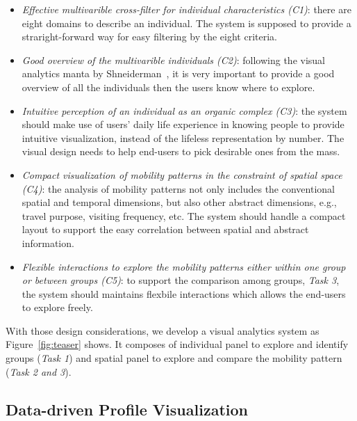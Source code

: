 \begin{itemize}
\item \textit{Effective multivarible cross-filter for individual characteristics (C1)}: there are eight domains to describe an individual. The system is supposed to provide a straright-forward way for easy filtering by the eight criteria.
\item \textit{Good overview of the multivarible individuals (C2)}: following the visual analytics manta by Shneiderman~\cite{RN459}, it is very important to provide a good overview of all the individuals then the users know where to explore. 
\item \textit{Intuitive perception of an individual as an organic complex (C3)}: the system should make use of users' daily life experience in knowing people to provide intuitive visualization, instead of the lifeless representation by number. The visual design needs to help end-users to pick desirable ones from the mass.  
\item \textit{Compact visualization of mobility patterns in the constraint of spatial space (C4)}: the analysis of mobility patterns not only includes the conventional spatial and temporal dimensions, but also other abstract dimensions, e.g., travel purpose, visiting frequency, etc. The system should handle a compact layout to support the easy correlation between spatial and abstract information. 
\item \textit{Flexible interactions to explore the mobility patterns either within one group or between groups (C5)}: to support the comparison among groups, \textit{Task 3}, the system should maintains flexbile interactions which allows the end-users to explore freely.
\end{itemize}


With those design considerations, we develop a visual analytics system as Figure~\ref{fig:teaser} shows. It composes of individual panel to explore and identify groups (\textit{Task 1}) and spatial panel to explore and compare the mobility pattern (\textit{Task 2 and 3}). 


\subsection{Data-driven Profile Visualization}

